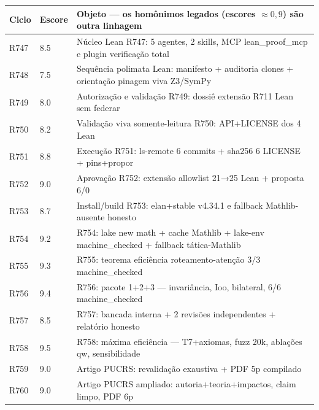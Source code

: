 \begin{tabular}{lll}
\toprule
Ciclo & Escore & Objeto --- os homônimos legados (escores $\approx0{,}9$) são outra linhagem \\
\midrule
R747 & 8.5 & \parbox[t]{9cm}{\raggedright\footnotesize Núcleo Lean R747: 5 agentes, 2 skills, MCP lean\_proof\_mcp e plugin verificação total} \\
R748 & 7.5 & \parbox[t]{9cm}{\raggedright\footnotesize Sequência polimata Lean: manifesto + auditoria clones + orientação pinagem viva Z3/SymPy} \\
R749 & 8.0 & \parbox[t]{9cm}{\raggedright\footnotesize Autorização e validação R749: dossiê extensão R711 Lean sem federar} \\
R750 & 8.2 & \parbox[t]{9cm}{\raggedright\footnotesize Validação viva somente-leitura R750: API+LICENSE dos 4 Lean} \\
R751 & 8.8 & \parbox[t]{9cm}{\raggedright\footnotesize Execução R751: ls-remote 6 commits + sha256 6 LICENSE + pins+propor} \\
R752 & 9.0 & \parbox[t]{9cm}{\raggedright\footnotesize Aprovação R752: extensão allowlist 21→25 Lean + proposta 6/0} \\
R753 & 8.7 & \parbox[t]{9cm}{\raggedright\footnotesize Install/build R753: elan+stable v4.34.1 e fallback Mathlib-ausente honesto} \\
R754 & 9.2 & \parbox[t]{9cm}{\raggedright\footnotesize R754: lake new math + cache Mathlib + lake-env machine\_checked + fallback tática-Mathlib} \\
R755 & 9.3 & \parbox[t]{9cm}{\raggedright\footnotesize R755: teorema eficiência roteamento-atenção 3/3 machine\_checked} \\
R756 & 9.4 & \parbox[t]{9cm}{\raggedright\footnotesize R756: pacote 1+2+3 — invariância, Ioo, bilateral, 6/6 machine\_checked} \\
R757 & 8.5 & \parbox[t]{9cm}{\raggedright\footnotesize R757: bancada interna + 2 revisões independentes + relatório honesto} \\
R758 & 9.5 & \parbox[t]{9cm}{\raggedright\footnotesize R758: máxima eficiência — T7+axiomas, fuzz 20k, ablações qw, sensibilidade} \\
R759 & 9.0 & \parbox[t]{9cm}{\raggedright\footnotesize Artigo PUCRS: revalidação exaustiva + PDF 5p compilado} \\
R760 & 9.0 & \parbox[t]{9cm}{\raggedright\footnotesize Artigo PUCRS ampliado: autoria+teoria+impactos, claim limpo, PDF 6p} \\

\end{tabular}
